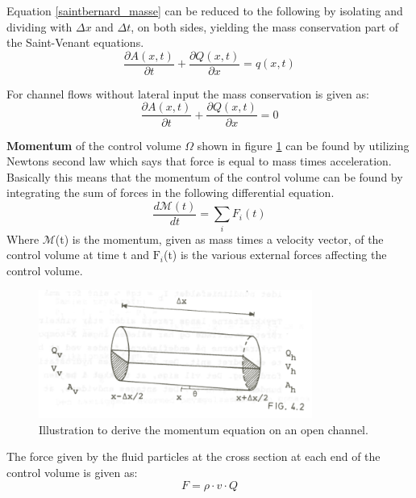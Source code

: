 Equation \ref{saintbernard_masse} can be reduced to the following by isolating and dividing with $\Delta x$ and $\Delta t$, on both sides, yielding the mass conservation part of the Saint-Venant equations.
\begin{equation}	
\frac{\partial A(x,t)}{\partial t} + \frac{\partial Q(x,t)}{\partial x}=q(x,t)
\label{saintbernard_mass_lateral}
\end{equation}

For channel flows without lateral input the mass conservation is given as:
\begin{equation}	
\boxed{\frac{\partial A(x,t)}{\partial t} + \frac{\partial Q(x,t)}{\partial x}=0}
\label{saintbernard_mass}
\end{equation}


\textbf{Momentum} of the control volume $\Omega$ shown in figure \ref{fig:momentum_picture} can be found by utilizing Newtons second law which says that force is equal to mass times acceleration.
Basically this means that the momentum of the control volume can be found by integrating the sum of forces in the following differential equation.
\begin{equation}\label{eq:momentum_eq}
	\frac{d \mathcal{M}(t)}{dt} = \sum_{i}F_i(t)
\end{equation} 
Where $\mathcal{M}$(t) is the momentum, given as mass times a velocity vector, of the control volume at time t and $\text{F}_i$(t) is the various external forces affecting the control volume.

\begin{figure}[H]
\centering
\includegraphics[width=0.8\textwidth]{report/modeling/pictures/momentum_picture.png}
\caption{Illustration to derive the momentum equation on an open channel.}
\label{fig:momentum_picture}
\end{figure}


The force given by the fluid particles at the cross section at each end of the control volume is given as:
\begin{equation}
	F= \rho \cdot v \cdot Q 
\end{equation}

